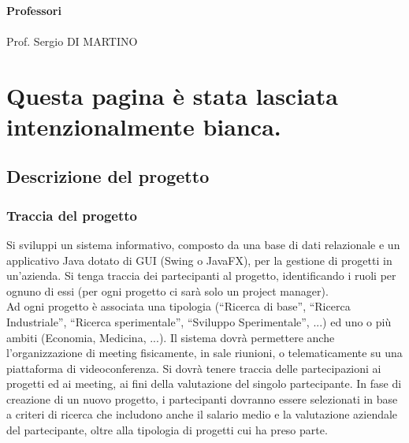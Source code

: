 \documentclass[a4paper,11pt]{report}
\begin{document}
\begin{titlepage}
\begin{minipage}[t]{0.4\textwidth}
\begin{flushleft}
			\end{flushleft}

		\end{minipage}
		~
		\begin{minipage}[t]{0.4\textwidth}

			\begin{flushright}

				\Large
				\textbf{Professori}\\
				~\\
				\large
				Prof. Sergio DI MARTINO\\

			\end{flushright}

		\end{minipage}
		
		\author{}
		\date{}

	\end{titlepage}
	\part*{Questa pagina è stata lasciata intenzionalmente bianca.}
	\tableofcontents
	\chapter{Descrizione del progetto}
		\section{Traccia del progetto}
			Si sviluppi un sistema informativo, composto da una base di dati relazionale e un applicativo Java dotato di
			GUI (Swing o JavaFX), per la gestione di progetti in un’azienda. Si tenga traccia dei partecipanti al progetto,
			identificando i ruoli per ognuno di essi (per ogni progetto ci sarà solo un project manager).\\ 
			Ad ogni progetto è associata una tipologia (“Ricerca di base”, “Ricerca Industriale”, “Ricerca sperimentale”, “Sviluppo
			Sperimentale”, ...) ed uno o più ambiti (Economia, Medicina, ...). Il sistema dovrà permettere anche
			l'organizzazione di meeting fisicamente, in sale riunioni, o telematicamente su una piattaforma di
			videoconferenza. Si dovrà tenere traccia delle partecipazioni ai progetti ed ai meeting, ai fini della valutazione
			del singolo partecipante. In fase di creazione di un nuovo progetto, i partecipanti dovranno essere selezionati
			in base a criteri di ricerca che includono anche il salario medio e la valutazione aziendale del partecipante,
			oltre alla tipologia di progetti cui ha preso parte.
		
\end{document}
